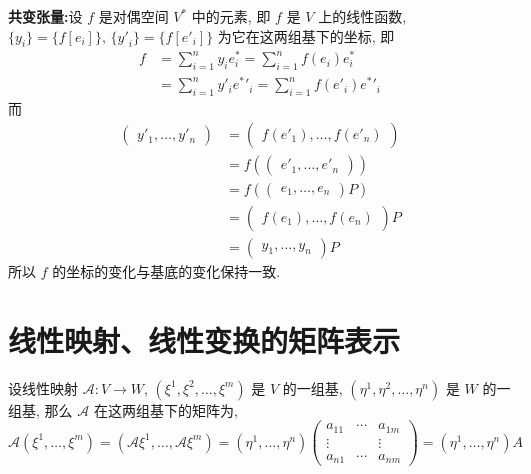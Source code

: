     \textbf{共变张量:}设 $f$ 是对偶空间 $V^*$ 中的元素, 即 $f$ 是 $V$ 上的线性函数, $\{y_i\} = \{f[e_i]\},\,\{{y'}_i\} = \{f[{e'}_i]\}$ 为它在这两组基下的坐标, 即
    \begin{align*}
        f &= \sum_{i=1}^{n}y_i e^*_i = \sum_{i=1}^{n}f(e_i)e^*_i \\
        &= \sum_{i=1}^{n}y'_i {e^*}'_i = \sum_{i=1}^{n}f(e'_i){e^*}'_i
    \end{align*}
    而
    \begin{align*}
        \begin{pmatrix}
            y'_1, \dots, y'_n
        \end{pmatrix} &= 
        \begin{pmatrix}
            f(e'_1), \dots, f(e'_n)
        \end{pmatrix} \\
        &= f\left(
            \begin{pmatrix}
                {e'}_1,\dots,{e'}_n
            \end{pmatrix}
        \right) \\
        &= f\left(
            \begin{pmatrix}
                e_1,\dots,e_n
            \end{pmatrix} P
        \right) \\
        &= \begin{pmatrix}
            f(e_1), \dots, f(e_n)
        \end{pmatrix}P \\
        &= \begin{pmatrix}
            y_1, \dots, y_n
        \end{pmatrix}P
    \end{align*}
    所以 $f$ 的坐标的变化与基底的变化保持一致.

\section{线性映射、线性变换的矩阵表示}

    设线性映射 $\mathcal{A}:V\rightarrow W$, $(\xi^1,\xi^2,\dots,\xi^m)$ 是 $V$ 的一组基, $(\eta^1,\eta^2,\dots,\eta^n)$ 是 $W$ 的一组基, 那么 $\mathcal{A}$ 在这两组基下的矩阵为,
    \begin{equation*}
        \mathcal{A}(\xi^1,\dots,\xi^m)=(\mathcal{A}\xi^1,\dots,\mathcal{A}\xi^m)=(\eta^1,\dots,\eta^n)
        \begin{pmatrix}
            a_{11} & \cdots & a_{1m} \\
            \vdots &        & \vdots \\
            a_{n1} & \cdots & a_{nm}
        \end{pmatrix} = (\eta^1,\dots,\eta^n)A
    \end{equation*}

